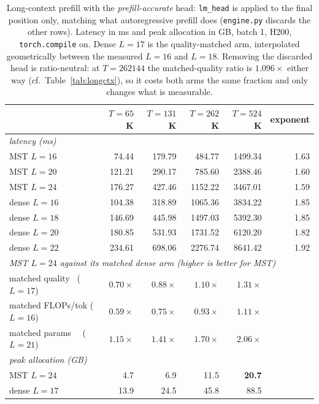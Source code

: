 \documentclass{article}
\begin{document}
\begin{table}[t]
\caption{Long-context prefill with the \emph{prefill-accurate} head: \texttt{lm\_head}
is applied to the final position only, matching what autoregressive prefill does
(\texttt{engine.py} discards the other rows). Latency in ms and peak allocation in GB,
batch 1, H200, \texttt{torch.compile} on. Dense $L{=}17$ is the quality-matched arm,
interpolated geometrically between the measured $L{=}16$ and $L{=}18$. Removing the
discarded head is ratio-neutral: at $T{=}262144$ the matched-quality ratio is
$1.096\times$ either way (cf.\ Table~\ref{tab:longctx}), so it costs both arms the same
fraction and only changes what is measurable.}
\label{tab:longctx2}
\begin{center}
\begin{small}
\setlength{\tabcolsep}{4pt}
\begin{tabular}{lrrrrr}
\toprule
 & $T{=}65$K & $T{=}131$K & $T{=}262$K & $T{=}524$K & exponent \\
\midrule
\multicolumn{6}{l}{\emph{latency (ms)}} \\
MST $L{=}16$   &  74.44 & 179.79 &  484.77 & 1499.34 & 1.63 \\
MST $L{=}20$   & 121.21 & 290.17 &  785.60 & 2388.46 & 1.60 \\
MST $L{=}24$   & 176.27 & 427.46 & 1152.22 & 3467.01 & 1.59 \\
dense $L{=}16$ & 104.38 & 318.89 & 1065.36 & 3834.22 & 1.85 \\
dense $L{=}18$ & 146.69 & 445.98 & 1497.03 & 5392.30 & 1.85 \\
dense $L{=}20$ & 180.85 & 531.93 & 1731.52 & 6120.20 & 1.82 \\
dense $L{=}22$ & 234.61 & 698.06 & 2276.74 & 8641.42 & 1.92 \\
\midrule
\multicolumn{6}{l}{\emph{MST $L{=}24$ against its matched dense arm (higher is better for MST)}} \\
matched quality \ ($L{=}17$) & $0.70\times$ & $0.88\times$ & $1.10\times$ & $\mathbf{1.31\times}$ & \\
matched FLOPs/tok ($L{=}16$) & $0.59\times$ & $0.75\times$ & $0.93\times$ & $\mathbf{1.11\times}$ & \\
matched params \ \ ($L{=}21$) & $1.15\times$ & $1.41\times$ & $1.70\times$ & $\mathbf{2.06\times}$ & \\
\midrule
\multicolumn{6}{l}{\emph{peak allocation (GB)}} \\
MST $L{=}24$   & 4.7 &  6.9 & 11.5 & \textbf{20.7} & \\
dense $L{=}17$ & 13.9 & 24.5 & 45.8 & 88.5 & \\
\bottomrule
\end{tabular}
\end{small}
\end{center}
\end{table}
\end{document}
